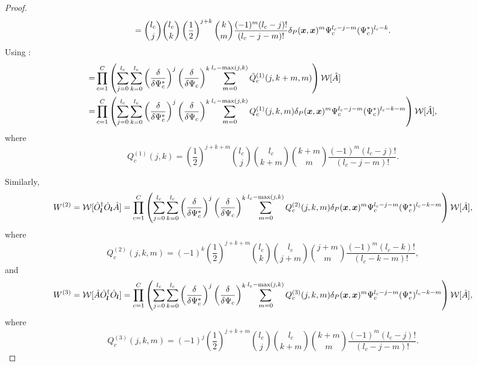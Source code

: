 \begin{proof}
\[	= \binom{l_c}{j} \binom{l_c}{k} \left( \frac{1}{2} \right)^{j + k}
		\binom{k}{m}
		\frac{(-1)^m (l_c - j)!}{(l_c - j - m)!}
		\delta_P(\boldsymbol{x}, \boldsymbol{x})^m
		\Psi_c^{l_c - j - m}
	(\Psi_c^*)^{l_c - k}.
\]
Using :
\begin{equation*}
\begin{split}
	= & \prod_{c=1}^C \left(
			\sum_{j=0}^{l_c}
			\sum_{k=0}^{l_c}
				\left( \frac{\delta}{\delta \Psi_c^*} \right)^j
				\left( \frac{\delta}{\delta \Psi_c} \right)^k
			\sum_{m=0}^{l_c - \max(j, k)}
				\tilde{Q}_c^{(1)}(j, k + m, m)
		\right)
		\mathcal{W}[\hat{A}] \\
	= & \prod_{c=1}^C \left(
			\sum_{j=0}^{l_c}
			\sum_{k=0}^{l_c}
				\left( \frac{\delta}{\delta \Psi_c^*} \right)^j
				\left( \frac{\delta}{\delta \Psi_c} \right)^k
				\sum_{m=0}^{l_c - \max(j, k)}
				Q_c^{(1)}(j, k, m)
				\delta_P(\boldsymbol{x}, \boldsymbol{x})^m
				\Psi_c^{l_c - j - m}
				(\Psi_c^*)^{l_c - k - m}
		\right)
		\mathcal{W}[\hat{A}],
\end{split}
\end{equation*}
where
\[
	Q_c^{(1)}(j, k)
	= \left( \frac{1}{2} \right)^{j + k + m}
		\binom{l_c}{j} \binom{l_c}{k + m} \binom{k + m}{m}
		\frac{(-1)^m (l_c - j)!}{(l_c - j - m)!}.
\]

Similarly,
\[
	W^{(2)}
	= \mathcal{W}[\hat{O}_{\boldsymbol{l}}^\dagger \hat{O}_{\boldsymbol{l}} \hat{A}] \\
	= \prod_{c=1}^C \left(
			\sum_{j=0}^{l_c}
			\sum_{k=0}^{l_c}
				\left( \frac{\delta}{\delta \Psi_c^*} \right)^j
				\left( \frac{\delta}{\delta \Psi_c} \right)^k
				\sum_{m=0}^{l_c - \max(j, k)}
				Q_c^{(2)}(j, k, m)
				\delta_P(\boldsymbol{x}, \boldsymbol{x})^m
				\Psi_c^{l_c - j - m}
				(\Psi_c^*)^{l_c - k - m}
		\right)
		\mathcal{W}[\hat{A}],
\]
where
\[
	Q_c^{(2)}(j, k, m)
	= (-1)^k \left( \frac{1}{2} \right)^{j + k + m}
		\binom{l_c}{k} \binom{l_c}{j + m} \binom{j + m}{m}
		\frac{(-1)^m (l_c - k)!}{(l_c - k - m)!},
\]
and
\[
	W^{(3)}
	= \mathcal{W}[\hat{A} \hat{O}_{\boldsymbol{l}}^\dagger \hat{O}_{\boldsymbol{l}}] \\
	= \prod_{c=1}^C \left(
			\sum_{j=0}^{l_c}
			\sum_{k=0}^{l_c}
				\left( \frac{\delta}{\delta \Psi_c^*} \right)^j
				\left( \frac{\delta}{\delta \Psi_c} \right)^k
				\sum_{m=0}^{l_c - \max(j, k)}
				Q_c^{(3)}(j, k, m)
				\delta_P(\boldsymbol{x}, \boldsymbol{x})^m
				\Psi_c^{l_c - j - m}
				(\Psi_c^*)^{l_c - k - m}
		\right)
		\mathcal{W}[\hat{A}],
\]
where
\[
	Q_c^{(3)}(j, k, m)
	= (-1)^j \left( \frac{1}{2} \right)^{j + k + m}
		\binom{l_c}{j} \binom{l_c}{k + m} \binom{k + m}{m}
		\frac{(-1)^m (l_c - j)!}{(l_c - j - m)!}.
\]


\end{proof}
